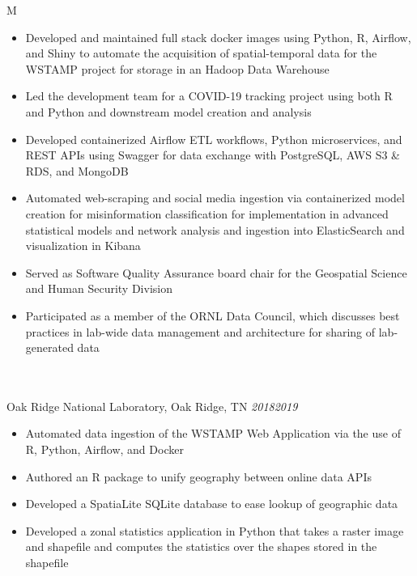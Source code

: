 \documentclass[10pt]{article}%
\begin{document}
\begin{tabularx}{\linewidth}{M}
\begin{itemize}[topsep=-12pt,parsep=0em]
            \item Developed and maintained full stack docker images using Python, R, Airflow, and Shiny to automate the acquisition of spatial-temporal data for the WSTAMP project for storage in an Hadoop Data Warehouse %
            \item Led the development team for a COVID-19 tracking project using both R and Python and downstream model creation and analysis %
            \item Developed containerized Airflow ETL workflows, Python microservices, and REST APIs using Swagger for data exchange with PostgreSQL, AWS S3 \& RDS, and MongoDB %
            \item Automated web-scraping and social media ingestion via containerized model creation for misinformation classification for implementation in advanced statistical models and network analysis and ingestion into ElasticSearch and visualization in Kibana %
            \item Served as Software Quality Assurance board chair for the Geospatial Science and Human Security Division %
            \item Participated as a member of the ORNL Data Council, which discusses best practices in lab-wide data management and architecture for sharing of lab-generated data %
        \end{itemize} \\
         \\
        Oak Ridge National Laboratory, Oak Ridge, TN \textit{2018\textemdash{}2019} \\
        \begin{itemize}[topsep=-12pt,parsep=0em]
            \setlength\itemsep{0em}
            \item Automated data ingestion of the WSTAMP Web Application via the use of R, Python, Airflow, and Docker %
            \item Authored an R package to unify geography between online data APIs %
            \item Developed a SpatiaLite SQLite database to ease lookup of geographic data %
            \item Developed a zonal statistics application in Python that takes a raster image and shapefile and computes the statistics over the shapes stored in the shapefile %
        \end{itemize} \\
         \\

\end{tabularx}
\end{document}
